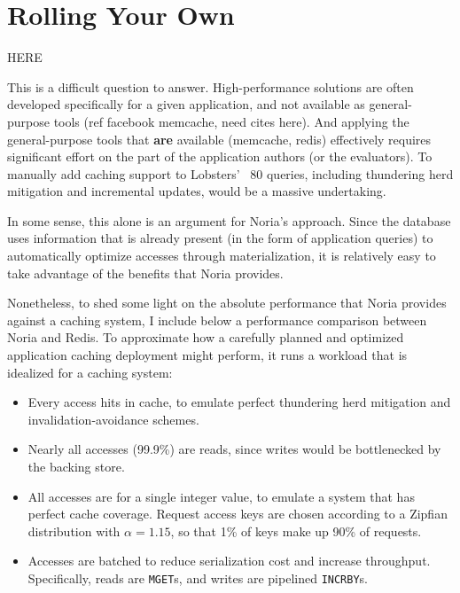 \section{Rolling Your Own}
\label{s:eval:existing}

\begin{inprogress}
  HERE
\end{inprogress}

This is a difficult question to answer. High-performance solutions are
often developed specifically for a given application, and not available
as general-purpose tools (ref facebook memcache, need cites here).
And applying the general-purpose tools that \textbf{are} available (memcache,
redis) effectively requires significant effort on the part of the application
authors (or the evaluators). To manually add caching support to Lobsters' ~80
queries, including thundering herd mitigation and incremental updates, would be
a massive undertaking.

In some sense, this alone is an argument for Noria's approach. Since the
database uses information that is already present (in the form of application
queries) to automatically optimize accesses through materialization, it is
relatively easy to take advantage of the benefits that Noria provides.

Nonetheless, to shed some light on the absolute performance that Noria provides
against a caching system, I include below a performance comparison between Noria
and Redis. To approximate how a carefully planned and optimized application
caching deployment might perform, it runs a workload that is idealized for a
caching system:

\begin{itemize}
 \item Every access hits in cache, to emulate perfect thundering herd mitigation
   and invalidation-avoidance schemes.
 \item Nearly all accesses (99.9\%) are reads, since writes would be
   bottlenecked by the backing store.
 \item All accesses are for a single integer value, to emulate a system that has
   perfect cache coverage. Request access keys are chosen according to a Zipfian
    distribution with $\alpha = 1.15$, so that 1\% of keys make up 90\% of
    requests.
 \item Accesses are batched to reduce serialization cost and increase
   throughput. Specifically, reads are \texttt{MGET}s, and writes are pipelined
    \texttt{INCRBY}s.
\end{itemize}

